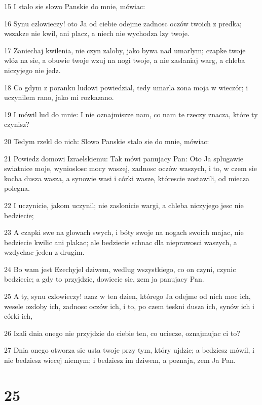 \par 15 I stalo sie slowo Panskie do mnie, mówiac:
\par 16 Synu czlowieczy! oto Ja od ciebie odejme zadnosc oczów twoich z predka; wszakze nie kwil, ani placz, a niech nie wychodza lzy twoje.
\par 17 Zaniechaj kwilenia, nie czyn zaloby, jako bywa nad umarlym; czapke twoje wlóz na sie, a obuwie twoje wzuj na nogi twoje, a nie zaslaniaj warg, a chleba niczyjego nie jedz.
\par 18 Co gdym z poranku ludowi powiedzial, tedy umarla zona moja w wieczór; i uczynilem rano, jako mi rozkazano.
\par 19 I mówil lud do mnie: I nie oznajmiszze nam, co nam te rzeczy znacza, które ty czynisz?
\par 20 Tedym rzekl do nich: Slowo Panskie stalo sie do mnie, mówiac:
\par 21 Powiedz domowi Izraelskiemu: Tak mówi panujacy Pan: Oto Ja splugawie swiatnice moje, wynioslosc mocy waszej, zadnosc oczów waszych, i to, w czem sie kocha dusza wasza, a synowie wasi i córki wasze, którescie zostawili, od miecza polegna.
\par 22 I uczynicie, jakom uczynil; nie zaslonicie wargi, a chleba niczyjego jesc nie bedziecie;
\par 23 A czapki swe na glowach swych, i bóty swoje na nogach swoich majac, nie bedziecie kwilic ani plakac; ale bedziecie schnac dla nieprawosci waszych, a wzdychac jeden z drugim.
\par 24 Bo wam jest Ezechyjel dziwem, wedlug wszystkiego, co on czyni, czynic bedziecie; a gdy to przyjdzie, dowiecie sie, zem ja panujacy Pan.
\par 25 A ty, synu czlowieczy! azaz w ten dzien, którego Ja odejme od nich moc ich, wesele ozdoby ich, zadnosc oczów ich, i to, po czem teskni dusza ich, synów ich i córki ich,
\par 26 Izali dnia onego nie przyjdzie do ciebie ten, co uciecze, oznajmujac ci to?
\par 27 Dnia onego otworza sie usta twoje przy tym, który ujdzie; a bedziesz mówil, i nie bedziesz wiecej niemym; i bedziesz im dziwem, a poznaja, zem Ja Pan.

\chapter{25}

